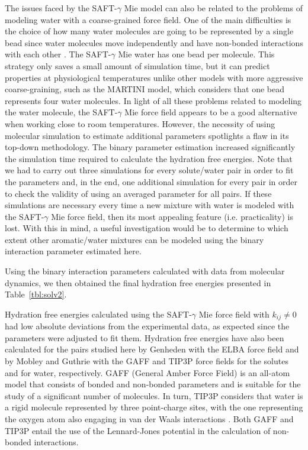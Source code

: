 \documentclass[preprint]{elsarticle}
\begin{document}
	The issues faced by the SAFT-$\gamma$ Mie model can also be related to the problems of modeling water with a coarse-grained force field.
	One of the main difficulties is the choice of how many water molecules are going to be represented by a single bead since water molecules move independently and have non-bonded interactions with each other \cite{hadley2010,hadley2012}.
	The SAFT-$\gamma$ Mie water has one bead per molecule.
	This strategy only saves a small amount of simulation time, but it can predict properties at physiological temperatures unlike other models with more aggressive coarse-graining, such as the MARTINI model, which considers that one bead represents four water molecules.
	In light of all these problems related to modeling the water molecule, the SAFT-$\gamma$ Mie force field appears to be a good alternative when working close to room temperatures.
	However, the necessity of using molecular simulation to estimate additional parameters spotlights a flaw in its top-down methodology.
	The binary parameter estimation increased significantly the simulation time required to calculate the hydration free energies.
	Note that we had to carry out three simulations for every solute/water pair in order to fit the parameters and, in the end, one additional simulation for every pair in order to check the validity of using an averaged parameter for all pairs.
	If these simulations are necessary every time a new mixture with water is modeled with the SAFT-$\gamma$ Mie force field, then its most appealing feature (i.e. practicality) is lost.
	With this in mind, a useful investigation would be to determine to which extent other aromatic/water mixtures can be modeled using the binary interaction parameter estimated here.
	
	Using the binary interaction parameters calculated with data from molecular dynamics, we then obtained the final hydration free energies presented in Table~\ref{tbl:solv2}.
	
	Hydration free energies calculated using the SAFT-$\gamma$ Mie force field with $k_{ij} \neq 0$ had low absolute deviations from the experimental data, as expected since the parameters were adjusted to fit them.
	Hydration free energies have also been calculated for the pairs studied here by Genheden \cite{doi:10.1021/acs.jctc.5b00963} with the ELBA force field and by Mobley and Guthrie \cite{PMID:24928188} with the GAFF and TIP3P force fields for the solutes and for water, respectively.
	GAFF (General Amber Force Field) is an all-atom model that consists of bonded and non-bonded parameters and is suitable for the study of a significant number of molecules.
	In turn, TIP3P considers that water is a rigid molecule represented by three point-charge sites, with the one representing the oxygen atom also engaging in van der Waals interactions \cite{doi:10.1063/1.445869}.
	Both GAFF and TIP3P entail the use of the Lennard-Jones potential in the calculation of non-bonded interactions.
	
\end{document}
